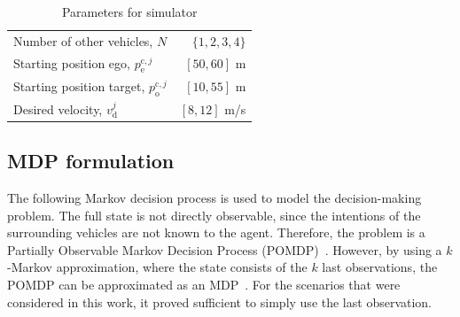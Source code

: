 \begin{table}[!bt]
	\renewcommand{\arraystretch}{1.2}
	\caption{Parameters for simulator}
	\label{tab:simulator_parameters}
	\centering
	\begin{tabular}{lr}
		\toprule
		Number of other vehicles, $N$ & $\{1,2,3,4\}$ \\
		Starting position ego, $p^{\mathrm{c},j}_\mathrm{e}$ & $[50, 60]$ m\\
		Starting position target, $p^{\mathrm{c},j}_\mathrm{o}$ & $[10, 55]$ m\\
		Desired velocity, $v_\mathrm{d}^j$ & $[8,12]$ m/s\\
		\bottomrule
	\end{tabular}

\end{table}

\subsection{MDP formulation}
The following Markov decision process is used to model the decision-making problem.
The full state is not directly observable, since the intentions of the surrounding vehicles are not known to the agent. Therefore, the problem is a Partially Observable Markov Decision Process (POMDP)~\cite{Kaelbling1998}. However, by using a $k$-Markov approximation, where the state consists of the $k$ last observations, the POMDP can be approximated as an MDP~\cite{Mnih2015}. For the scenarios that were considered in this work, it proved sufficient to simply use the last observation.



